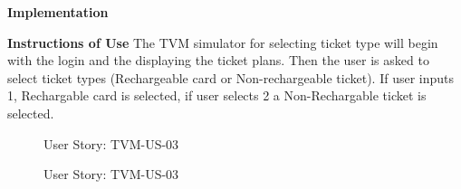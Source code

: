 \documentclass[a4paper,12pt]{report}
\begin{document}
\begin{flushleft}
	\textbf{Implementation}
	
	\vspace{0.5cm}
	\textbf{Instructions of Use}
	The TVM simulator for selecting ticket type will begin with the login and the displaying the ticket plans. Then the user is asked to select ticket types (Rechargeable card or Non-rechargeable ticket). If user inputs 1, Rechargable card is selected, if user selects 2 a Non-Rechargable ticket is selected.
	
	\begin{figure}[!htb]
		\caption{\label{fig:tvm03_1}User Story: TVM-US-03}	
	\end{figure}

	\begin{figure}[!htb]
		\caption{\label{fig:tvm03_2}User Story: TVM-US-03}	
	\end{figure}
	

\end{flushleft}
\end{document}
